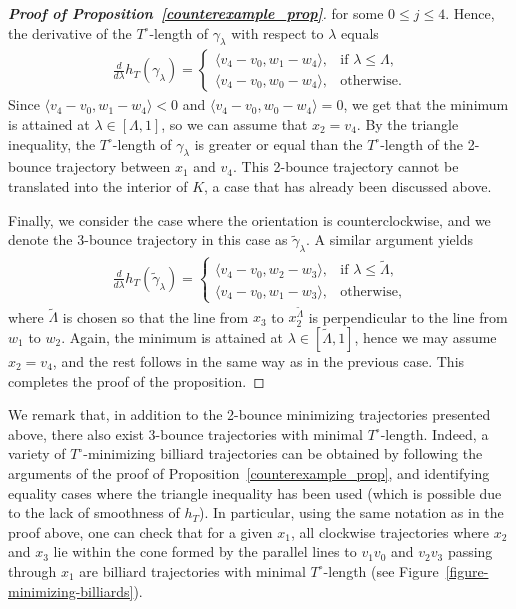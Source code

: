 \documentclass[10pt,a4paper]{article}
\theoremstyle{definition}
\begin{document}
\begin{proof}[{\bf Proof of Proposition~\ref{counterexample_prop}}]
for some $0\leq j \leq4$.
Hence, the derivative of the $T^\circ$-length of $\gamma_\lambda$ with respect to $\lambda$ equals 
\begin{align*}
\frac{d}{d \lambda}h_T(\gamma_\lambda) = 
\begin{cases}
\langle v_4 - v_0, w_1 - w_4\rangle , & \text{if } \lambda \leq \Lambda, \\
\langle v_4 - v_0, w_0 - w_4\rangle , & \text{otherwise}.
\end{cases}
\end{align*}
Since $\langle v_4 - v_0, w_1 - w_4\rangle < 0$ and $\langle v_4 - v_0, w_0 - w_4\rangle = 0$, we get that the minimum is attained at $\lambda \in [\Lambda,1]$,
so we can assume that $x_2=v_4$. By the triangle inequality, the $T^\circ$-length of $\gamma_\lambda$ is greater or equal than the $T^\circ$-length of the 2-bounce trajectory between $x_1$ and $v_4$. 
This 2-bounce trajectory cannot be translated into the interior of $K$, 
a case that has already been discussed above.

\medskip 

Finally, we consider the case where the orientation is counterclockwise, and we denote the 3-bounce trajectory in this case as $\widetilde{\gamma}_\lambda$.
A similar argument yields
\begin{align*}
\frac{d}{d \lambda}h_T(\widetilde{\gamma}_\lambda) = 
\begin{cases}
\langle v_4 - v_0, w_2 - w_3\rangle , & \text{if } \lambda \leq \widetilde{\Lambda}, \\
\langle v_4 - v_0, w_1 - w_3\rangle , & \text{otherwise},
\end{cases}
\end{align*}
where $\widetilde{\Lambda}$ is chosen so that the line from $x_3$ to $x_2^{\widetilde{\Lambda}}$ is perpendicular to the line from $w_1$ to $w_2$.
Again, the minimum is attained at $\lambda \in [\widetilde{\Lambda},1]$, hence we may assume $x_2 = v_4$, and the rest follows in the same way as in the previous case. 
This completes the proof of the proposition. 
\end{proof}

We remark that, in addition to the 2-bounce minimizing trajectories presented above, there also exist 3-bounce trajectories  with minimal \( T^\circ \)-length. Indeed, a variety of \( T^\circ \)-minimizing billiard trajectories can be obtained by following the arguments of the proof of Proposition~\ref{counterexample_prop}, and identifying equality cases where the triangle inequality has been used (which is possible due to the lack of smoothness of \( h_T \)).  
In particular, using the same notation as in the proof above, one can check that for a given \( x_1 \), all clockwise trajectories where \( x_2 \) and \( x_3 \) lie within the cone formed by the parallel lines to \( v_1v_0 \) and \( v_2v_3 \) passing through \( x_1 \) are billiard trajectories with minimal \( T^\circ \)-length (see  Figure~\ref{figure-minimizing-billiards}).
\end{document}
